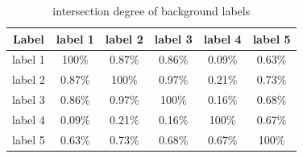 \documentclass[runningheads,a4paper]{llncs}
\begin{document}
\begin{table}
\centering
\begin{tabular}{|c|c|c|c|c|c|}
\hline
 Label & label 1 & label 2 & label 3 & label 4& label 5 \\
\hline
label 1 & 100\% & 0.87\% & 0.86\% & 0.09\%& 0.63\% \\
\hline
label 2 & 0.87\% & 100\% & 0.97\% & 0.21\%& 0.73\% \\
\hline
label 3 & 0.86\% & 0.97\% & 100\% & 0.16\%& 0.68\%\\
\hline
label 4 & 0.09\% & 0.21\% & 0.16\% & 100\%& 0.67\% \\
\hline
label 5 & 0.63\% & 0.73\% & 0.68\% & 0.67\% & 100\% \\
\hline
\end{tabular}
\captionsetup{justification=centerlast}
\caption{intersection degree of background labels}
\label{ta:intersection degree b}
\end{table}
\end{document}
